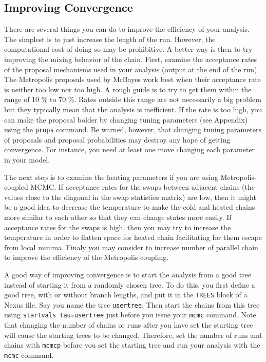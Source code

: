 \documentclass[12pt]{book}
\newcommand{\ttt}[1]{\texttt{#1}}
\begin{document}
\subsection{Improving Convergence}

There are several things you can do to improve the efficiency of your analysis. The simplest is to
just increase the length of the run. However, the computational cost of doing so may be
prohibitive. A better way is then to try improving the mixing behavior of the chain. First, examine
the acceptance rates of the proposal mechanisms used in your analysis (output at the end of the
run). The Metropolis proposals used by MrBayes work best when their acceptance rate is neither too
low nor too high. A rough guide is to try to get them within the range of 10 \% to 70 \%. Rates
outside this range are not necessarily a big problem but they typically mean that the analysis is
inefficient. If the rate is too high, you can make the proposal bolder by changing tuning
parameters (see Appendix) using the \ttt{props} command. Be warned, however, that changing tuning
parameters of proposals and proposal probabilities may destroy any hope of getting convergence. For
instance, you need at least one move changing each parameter in your model.

The next step is to examine the heating parameters if you are using Metropolis-coupled MCMC. If
acceptance rates for the swaps between adjacent chains (the values close to the diagonal in the
swap statistics matrix) are low, then it might be a good idea to decrease the temperature to make
the cold and heated chains more similar to each other so that they can change states more easily.
If acceptance rates for the swaps is high, then you may try to increase the temperature in order to
flatten space for heated chain facilitating for them escape from local minima. Finaly you may
consider to increase number of parallel chain to improve the efficiency of the Metropolis coupling.

A good way of improving convergence is to start the analysis from a good tree instead of starting
it from a randomly chosen tree. To do this, you first define a good tree, with or without branch
lengths, and put it in the \ttt{TREES} block of a Nexus file. Say you name the tree \ttt{usertree}.
Then start the chains from this tree using \ttt{startvals tau=usertree} just before you issue your
\ttt{mcmc} command. Note that changing the number of chains or runs after you have set the starting
tree will cause the starting trees to be changed. Therefore, set the number of runs and chains with
\ttt{mcmcp} before you set the starting tree and run your analysis with the \ttt{mcmc} command.
\end{document}
